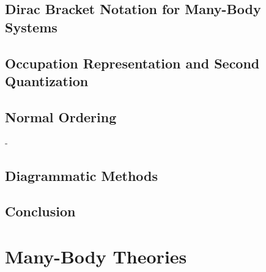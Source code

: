 \documentclass[12pt]{book}
\begin{document}
    \section{Dirac Bracket Notation for Many-Body Systems}
                

    \section{Occupation Representation and Second Quantization}
        

    \section{Normal Ordering}
        -

    \section{Diagrammatic Methods}
        
    \section{Conclusion}
        



\chapter{Many-Body Theories}
    
\end{document}
